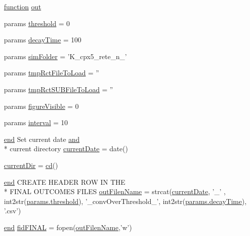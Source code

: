 \begin{DoxyCompactItemize}
\item 
\hyperlink{a00068_a4b4c670b101bf7a838f775e008fa6255}{function} \hyperlink{a00028_a34c820385e9209f49c18739329ad9206}{out}
\item 
params \hyperlink{a00028_aa022cbb28f80299d572def08e7a5ccfd}{threshold} = 0
\item 
params \hyperlink{a00028_abd7ce2c4bf5f563b1e70731f58e8c57d}{decay\-Time} = 100
\item 
params \hyperlink{a00028_a0ffb8131632b48d9111c3a27d91262e2}{sim\-Folder} = 'K\-\_\-cpx5\-\_\-rete\-\_\-n\-\_\-'
\item 
params \hyperlink{a00028_a3b01c97f207a2997c3bd0c2718441509}{tmp\-Rct\-File\-To\-Load} = ''
\item 
params \hyperlink{a00028_ae5d21adddbfe36d5b10d43a2e8b39123}{tmp\-Rct\-S\-U\-B\-File\-To\-Load} = ''
\item 
params \hyperlink{a00028_a0eef57d24680b0a2e17d81a50229e3cb}{figure\-Visible} = 0
\item 
params \hyperlink{a00028_a4d8f56ee83b9b4dbe17b218746a1768c}{interval} = 10
\item 
\hyperlink{a00025_afb358f48b1646c750fb9da6c6585be2b}{end} Set current date \hyperlink{a00028_a170f8acb213f91bf71c77b1d20bceb33}{and} \\*
current directory \hyperlink{a00028_a54768c0405781065cb2f7a16ab8e7d31}{current\-Date} = date()
\item 
\hyperlink{a00028_af32eb97339f1e9d37b5540de2cbc79c9}{current\-Dir} = \hyperlink{a00068_a767271ad82d244871370a0f0e6a7f8a4}{cd}()
\item 
\hyperlink{a00025_afb358f48b1646c750fb9da6c6585be2b}{end} C\-R\-E\-A\-T\-E H\-E\-A\-D\-E\-R R\-O\-W I\-N T\-H\-E \\*
F\-I\-N\-A\-L O\-U\-T\-C\-O\-M\-E\-S F\-I\-L\-E\-S \hyperlink{a00028_af42e186bcb2ad28b937ef14407da1f0d}{out\-Filen\-Name} = strcat(\hyperlink{a00028_a54768c0405781065cb2f7a16ab8e7d31}{current\-Date}, '\-\_\-' , int2str(\hyperlink{a00036_aa022cbb28f80299d572def08e7a5ccfd}{params.\-threshold}), '\-\_\-conv\-Over\-Threshold\-\_\-', int2str(\hyperlink{a00036_afb6aa83fb78c663f3b39be2380842a8b}{params.\-decay\-Time}), '.csv')
\item 
\hyperlink{a00025_afb358f48b1646c750fb9da6c6585be2b}{end} \hyperlink{a00028_a2f1bf22f6a0c3f5791577061e92c0433}{fid\-F\-I\-N\-A\-L} = fopen(\hyperlink{a00028_af42e186bcb2ad28b937ef14407da1f0d}{out\-Filen\-Name},'w')
\item 

\end{DoxyCompactItemize}
